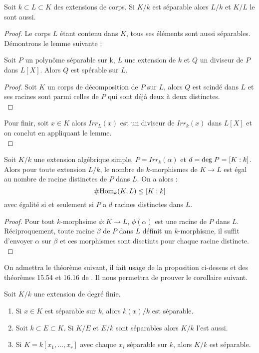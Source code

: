 \documentclass[a4paper]{article} %
\numberwithin{section}{part}
\numberwithin{equation}{section}
\begin{document}
\begin{prop}
Soit $k \subset L \subset K$ des extensions de corps. Si $K/k$ est séparable
alors $L/k$ et $K/L$ le sont aussi.
\end{prop}
\begin{proof}
Le corps $L$ étant contenu dans $K$, tous ses éléments sont aussi séparables.
Démontrons le lemme suivante :
\begin{lem}
\label{divsep}
Soit $P$ un polynôme séparable sur k, $L$ une extension de $k$ et $Q$ un
diviseur de $P$ dans $L[X]$. Alors $Q$ est spérable sur $L$.
\end{lem}
\begin{proof}
Soit $K$ un corps de décomposition de $P$ sur $L$, alors $Q$ est scindé dans $L$
et ses racines sont parmi celles de $P$ qui sont déjà deux à deux distinctes.\\
\end{proof}
Pour finir, soit $x\in K$ alors $Irr_L(x)$ est un diviseur de $Irr_k(x)$ dans
$L[X]$ et on conclut en appliquant le lemme.\\
\end{proof}

\begin{prop}
\label{nbautroot}
Soit $K/k$ une extension algébrique simple, $P = Irr_k(\alpha)$ et $d =
\textup{deg\;}P = [K:k]$. Alors pour toute extension $L/k$, le nombre de
$k$-morphismes de $K \to L$ est égal au nombre de racine distinctes de $P$ dans
$L$. On a alors :
\[\#\textup{Hom}_k(K,L)\leq[K:k]\]
avec égalité si et seulement si $P$ a $d$ racines distinctes dans $L$.
\end{prop}
\begin{proof}
Pour tout $k$-morphsime $\phi : K\to L$, $\phi(\alpha)$ est une racine de $P$
dans $L$. Réciproquement, toute racine $\beta$ de $P$ dans $L$ définit un
$k$-morphisme, il suffit d'envoyer $\alpha$ sur $\beta$ et ces morphismes sont
disctints pour chaque racine distincte.\\
\end{proof}

On admettra le théorème suivant, il fait usage de la proposition ci-dessus et
des théorèmes 15.54 et 16.16 de \cite[Chap. VIII]{Pol}. Il nous permettra de
prouver le corollaire suivant.

\begin{thm}
Soit $K/k$ une extension de degré finie. 

\begin{enumerate}[(1)]
\item Si $x\in K$ est séparable sur $k$, alors $k(x)/k$ est séparable.

\item Soit $k \subset E \subset K$. Si $K/E$ et $E/k$ sont séparables alors
$K/k$ l'est aussi.

\item Si $K = k[x_1,\dots,x_r]$ avec chaque $x_i$ séparable sur $k$, alors $K/k$
est séparable.
\end{enumerate}
\end{thm}
\end{document}
